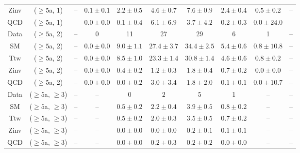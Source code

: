 \begin{table}[h!]
{\begin{tabular}{cccccccccc}
	Zinv & ($\ge5$a, 1) & -- & $0.1\pm 0.1$ & $2.2\pm 0.5$ & $4.6\pm 0.7$ & $7.6\pm 0.9$ & $2.4\pm 0.4$ & $0.5\pm 0.2$ & -- \\[0.5ex] 
	QCD & ($\ge5$a, 1) & -- & $0.0\pm 0.0$ & $0.1\pm 0.4$ & $6.1\pm 6.9$ & $3.7\pm 4.2$ & $0.2\pm 0.3$ & $0.0\pm 24.0$ & -- \\[0.5ex] 
	Data & ($\ge5$a, 2) & -- & 0 & 11 & 27 & 29 & 6 & 1 & -- \\[0.5ex] 
	SM & ($\ge5$a, 2) & -- & $0.0\pm 0.0$ & $9.0\pm 1.1$ & $27.4\pm 3.7$ & $34.4\pm 2.5$ & $5.4\pm 0.6$ & $0.8\pm 10.8$ & -- \\[0.5ex] 
	Ttw & ($\ge5$a, 2) & -- & $0.0\pm 0.0$ & $8.5\pm 1.0$ & $23.3\pm 1.4$ & $30.8\pm 1.4$ & $4.6\pm 0.6$ & $0.8\pm 0.2$ & -- \\[0.5ex] 
	Zinv & ($\ge5$a, 2) & -- & $0.0\pm 0.0$ & $0.4\pm 0.2$ & $1.2\pm 0.3$ & $1.8\pm 0.4$ & $0.7\pm 0.2$ & $0.0\pm 0.0$ & -- \\[0.5ex] 
	QCD & ($\ge5$a, 2) & -- & $0.0\pm 0.0$ & $0.0\pm 0.2$ & $3.0\pm 3.4$ & $1.8\pm 2.0$ & $0.1\pm 0.1$ & $0.0\pm 10.7$ & -- \\[0.5ex] 
	Data & ($\ge5$a, $\ge3$) & -- & -- & 0 & 2 & 5 & 1 & -- & -- \\[0.5ex] 
	SM & ($\ge5$a, $\ge3$) & -- & -- & $0.5\pm 0.2$ & $2.2\pm 0.4$ & $3.9\pm 0.5$ & $0.8\pm 0.2$ & -- & -- \\[0.5ex] 
	Ttw & ($\ge5$a, $\ge3$) & -- & -- & $0.5\pm 0.2$ & $2.0\pm 0.3$ & $3.5\pm 0.5$ & $0.7\pm 0.2$ & -- & -- \\[0.5ex] 
	Zinv & ($\ge5$a, $\ge3$) & -- & -- & $0.0\pm 0.0$ & $0.0\pm 0.0$ & $0.2\pm 0.1$ & $0.1\pm 0.1$ & -- & -- \\[0.5ex] 
	QCD & ($\ge5$a, $\ge3$) & -- & -- & $0.0\pm 0.0$ & $0.2\pm 0.3$ & $0.2\pm 0.2$ & $0.0\pm 0.0$ & -- & -- \\[0.5ex] 
	\hline
	\hline
\end{tabular}}
\end{table}
